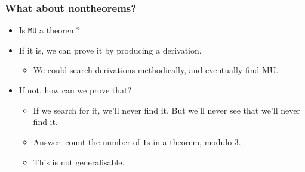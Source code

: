 \documentclass[mathserif]{beamer}
\begin{document}
\begin{frame}
\frametitle{What about nontheorems?}
\label{sec-2-3}
\begin{itemize}

\item Is \texttt{MU} a theorem?\\
\label{sec-2-3-1}%
\item If it is, we can prove it by producing a derivation.
\label{sec-2-3-2}%
\begin{itemize}

\item We could search derivations methodically, and eventually find MU.\\
\label{sec-2-3-2-1}%
\end{itemize} %

\item If not, how can we prove that?
\label{sec-2-3-3}%
\begin{itemize}

\item If we search for it, we'll never find it. But we'll never see that we'll never find it.\\
\label{sec-2-3-3-1}%
\item Answer: count the number of \texttt{I}s in a theorem, modulo 3.\\
\label{sec-2-3-3-2}%
\item This is not generalisable.\\
\label{sec-2-3-3-3}%
\end{itemize} %
\end{itemize} %
\end{frame}
\end{document}
